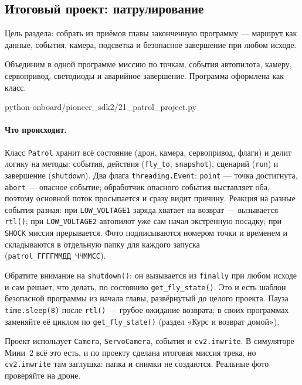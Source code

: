 \subsection{Итоговый проект: патрулирование}

Цель раздела: собрать из приёмов главы законченную программу --- маршрут как данные, события, камера, подсветка и безопасное завершение при любом исходе.

Объединим в одной программе миссию по точкам, события автопилота, камеру, сервопривод, светодиоды и аварийное завершение. Программа оформлена как класс.

\begin{codefile}[python]{python-onboard/pioneer_sdk2/21_patrol_project.py}
\end{codefile}

\paragraph{Что происходит.} Класс \verb|Patrol| хранит всё состояние (дрон, камера, сервопривод, флаги) и делит логику на методы: события, действия (\verb|fly_to|, \verb|snapshot|), сценарий (\verb|run|) и завершение (\verb|shutdown|). Два флага \verb|threading.Event|: \verb|point| --- точка достигнута, \verb|abort| --- опасное событие; обработчик опасного события выставляет оба, поэтому основной поток просыпается и сразу видит причину. Реакция на разные события разная: при \verb|LOW_VOLTAGE1| заряда хватает на возврат --- вызывается \verb|rtl()|; при \verb|LOW_VOLTAGE2| автопилот уже сам начал экстренную посадку; при \verb|SHOCK| миссия прерывается. Фото подписываются номером точки и временем и складываются в отдельную папку для каждого запуска (\texttt{patrol\_ГГГГММДД\_ЧЧММСС}).

Обратите внимание на \verb|shutdown()|: он вызывается из \verb|finally| при любом исходе и сам решает, что делать, по состоянию \verb|get_fly_state()|. Это и есть шаблон безопасной программы из начала главы, развёрнутый до целого проекта. Пауза \verb|time.sleep(8)| после \verb|rtl()| --- грубое ожидание возврата; в своих программах заменяйте её циклом по \verb|get_fly_state()| (раздел «Курс и возврат домой»).

\begin{infobox}
Проект использует \verb|Camera|, \verb|ServoCamera|, события и \verb|cv2.imwrite|. В симуляторе Мини~2 всё это есть, и по проекту сделана итоговая миссия трека, но \verb|cv2.imwrite| там заглушка: папка и снимки не создаются. Реальные фото проверяйте на дроне.
\end{infobox}

